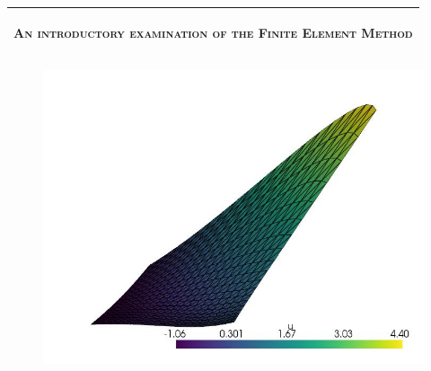 %
%
%
%
%
\begin{titlepage}
  \addtolength{\hoffset}{0.5\evensidemargin-0.5\oddsidemargin} %
  \noindent%
  \begin{tabular}{@{}p{\textwidth}@{}}
    \toprule[2pt]
    \midrule
    \vspace{0.4cm}
    \begin{center}
    \Huge{\textsc{An introductory examination of the Finite Element Method}}
    \end{center}
    \vspace{0.4cm}\\
    \midrule
    \toprule[2pt]
  \end{tabular}
  \vspace{0.8cm}
  \setlength\fboxsep{0pt}
    \begin{figure}[ht]
        \centering
      \includegraphics[width=\textwidth]{Afsnit/Application/figurer/screenshot_3.jpeg}

\end{figure}
\end{titlepage}
